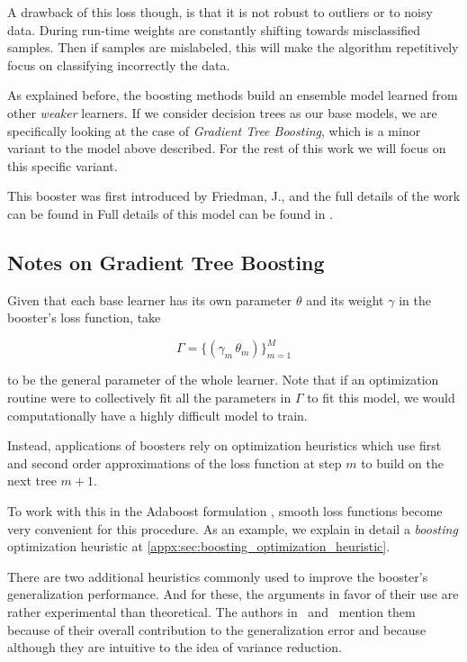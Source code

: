 A drawback of this loss though, is that it is not robust to outliers or to noisy data.
During run-time weights are constantly shifting towards misclassified samples.
Then if samples are mislabeled, this will make the algorithm repetitively focus on classifying incorrectly the data.


As explained before, the boosting methods build an ensemble model learned from other \textit{weaker} learners.
If we consider decision trees as our base models, we are specifically looking at the case of \textit{Gradient Tree Boosting}, which is a minor variant to the model above described.
For the rest of this work we will focus on this specific variant.

This booster was first introduced by Friedman, J., and the full details of the work can be found in Full details of this model can be found in \citep{friedman-gradientBoosting2001}.


\subsection{Notes on Gradient Tree Boosting}\label{subsection:boosting_other_notes}

Given that each base learner has its own parameter $\theta$  and its weight $\gamma$ in the booster's loss function, take

$$\Gamma = \{ (\gamma_m\,\theta_m) \}_{m=1}^M$$

to be the general parameter of the whole learner.
Note that if an optimization routine were to collectively fit all the parameters in $\Gamma$ to fit this model, we would computationally have a highly difficult model to train.

Instead, applications of boosters rely on optimization heuristics which use first and second order approximations of the loss function at step $m$ to build on the next tree $m+1$.

To work with this in the Adaboost formulation , smooth loss functions become very convenient for this procedure.
As an example, we explain in detail a \textit{boosting} optimization heuristic at \cref{appx:sec:boosting_optimization_heuristic}.

There are two additional heuristics commonly used to improve the booster's generalization performance.
And for these, the arguments in favor of their use are rather experimental than theoretical.
The authors in~\citep{hastie-elemstatslearn} and~\citep{bishop-patternecognition} mention them because of their overall contribution to the generalization error and because although they are intuitive to the idea of variance reduction.

